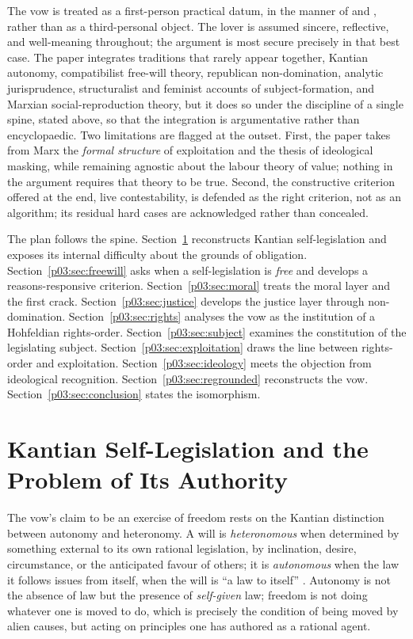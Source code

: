 \documentclass[11pt,a4paper]{article}
\begin{document}
The vow is treated as a first-person practical datum, in the manner of \textcite{frankfurt2004reasons} and \textcite{velleman1999love}, rather than as a third-personal object. The lover is assumed sincere, reflective, and well-meaning throughout; the argument is most secure precisely in that best case. The paper integrates traditions that rarely appear together, Kantian autonomy, compatibilist free-will theory, republican non-domination, analytic jurisprudence, structuralist and feminist accounts of subject-formation, and Marxian social-reproduction theory, but it does so under the discipline of a single spine, stated above, so that the integration is argumentative rather than encyclopaedic. Two limitations are flagged at the outset. First, the paper takes from Marx the \emph{formal structure} of exploitation and the thesis of ideological masking, while remaining agnostic about the labour theory of value; nothing in the argument requires that theory to be true. Second, the constructive criterion offered at the end, live contestability, is defended as the right criterion, not as an algorithm; its residual hard cases are acknowledged rather than concealed.

The plan follows the spine. Section~\ref{p03:sec:kant} reconstructs Kantian self-legislation and exposes its internal difficulty about the grounds of obligation. Section~\ref{p03:sec:freewill} asks when a self-legislation is \emph{free} and develops a reasons-responsive criterion. Section~\ref{p03:sec:moral} treats the moral layer and the first crack. Section~\ref{p03:sec:justice} develops the justice layer through non-domination. Section~\ref{p03:sec:rights} analyses the vow as the institution of a Hohfeldian rights-order. Section~\ref{p03:sec:subject} examines the constitution of the legislating subject. Section~\ref{p03:sec:exploitation} draws the line between rights-order and exploitation. Section~\ref{p03:sec:ideology} meets the objection from ideological recognition. Section~\ref{p03:sec:regrounded} reconstructs the vow. Section~\ref{p03:sec:conclusion} states the isomorphism.

\section{Kantian Self-Legislation and the Problem of Its Authority}\label{p03:sec:kant}

The vow's claim to be an exercise of freedom rests on the Kantian distinction between autonomy and heteronomy. A will is \emph{heteronomous} when determined by something external to its own rational legislation, by inclination, desire, circumstance, or the anticipated favour of others; it is \emph{autonomous} when the law it follows issues from itself, when the will is ``a law to itself'' \parencite[4:440]{kant1785groundwork}. Autonomy is not the absence of law but the presence of \emph{self-given} law; freedom is not doing whatever one is moved to do, which is precisely the condition of being moved by alien causes, but acting on principles one has authored as a rational agent.
\end{document}
